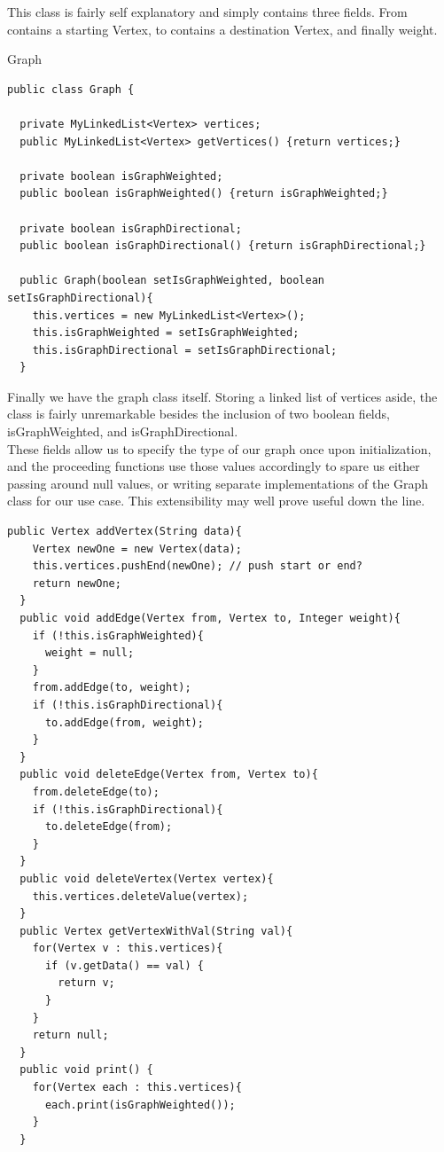 \documentclass[a4paper]{article}
\begin{document}
This class is fairly self explanatory and simply contains three fields.
From contains a starting Vertex, to contains a destination Vertex,
and finally weight. 
\newpage

\begin{algorithm}
\caption{Graph}\label{euclid}

\begin{verbatim}
public class Graph {
  
  private MyLinkedList<Vertex> vertices;
  public MyLinkedList<Vertex> getVertices() {return vertices;}

  private boolean isGraphWeighted;
  public boolean isGraphWeighted() {return isGraphWeighted;}

  private boolean isGraphDirectional;
  public boolean isGraphDirectional() {return isGraphDirectional;}

  public Graph(boolean setIsGraphWeighted, boolean setIsGraphDirectional){
    this.vertices = new MyLinkedList<Vertex>();
    this.isGraphWeighted = setIsGraphWeighted;
    this.isGraphDirectional = setIsGraphDirectional;
  }
\end{verbatim}
\end{algorithm}

\vspace{8mm}

Finally we have the graph class itself. Storing a linked list of vertices aside,
the class is fairly unremarkable besides
the inclusion of two boolean fields, isGraphWeighted, and isGraphDirectional. \\

These fields allow us to specify the type of our graph once upon initialization,
and the proceeding functions use those values accordingly to spare us either passing around null values,
or writing separate implementations of the Graph class for our use case. This extensibility may well
prove useful down the line.



\newpage
\begin{verbatim}
public Vertex addVertex(String data){
    Vertex newOne = new Vertex(data);
    this.vertices.pushEnd(newOne); // push start or end?
    return newOne;
  }
  public void addEdge(Vertex from, Vertex to, Integer weight){
    if (!this.isGraphWeighted){
      weight = null;
    }
    from.addEdge(to, weight);
    if (!this.isGraphDirectional){
      to.addEdge(from, weight);
    }
  }
  public void deleteEdge(Vertex from, Vertex to){
    from.deleteEdge(to);
    if (!this.isGraphDirectional){
      to.deleteEdge(from);
    }
  }
  public void deleteVertex(Vertex vertex){
    this.vertices.deleteValue(vertex);
  }
  public Vertex getVertexWithVal(String val){
    for(Vertex v : this.vertices){
      if (v.getData() == val) {
        return v;
      }
    }
    return null;
  }
  public void print() {
    for(Vertex each : this.vertices){
      each.print(isGraphWeighted());
    }
  }

\end{verbatim}
\end{document}
